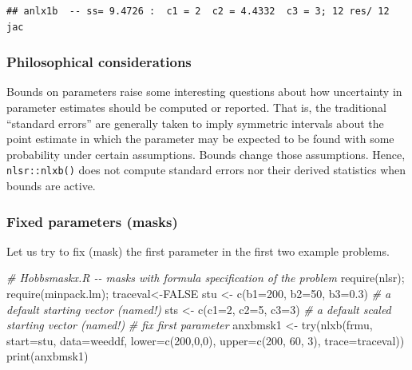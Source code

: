 \documentclass[
]{article}
\newenvironment{Shaded}{\begin{snugshade}}{\end{snugshade}}
\newcommand{\AttributeTok}[1]{\textcolor[rgb]{0.77,0.63,0.00}{#1}}
\newcommand{\CommentTok}[1]{\textcolor[rgb]{0.56,0.35,0.01}{\textit{#1}}}
\newcommand{\ConstantTok}[1]{\textcolor[rgb]{0.00,0.00,0.00}{#1}}
\newcommand{\DecValTok}[1]{\textcolor[rgb]{0.00,0.00,0.81}{#1}}
\newcommand{\FloatTok}[1]{\textcolor[rgb]{0.00,0.00,0.81}{#1}}
\newcommand{\FunctionTok}[1]{\textcolor[rgb]{0.00,0.00,0.00}{#1}}
\newcommand{\NormalTok}[1]{#1}
\newcommand{\OtherTok}[1]{\textcolor[rgb]{0.56,0.35,0.01}{#1}}
\begin{document}
\begin{verbatim}
## anlx1b  -- ss= 9.4726 :  c1 = 2  c2 = 4.4332  c3 = 3; 12 res/ 12 jac
\end{verbatim}

\hypertarget{philosophical-considerations}{%
\subsubsection{Philosophical
considerations}\label{philosophical-considerations}}

Bounds on parameters raise some interesting questions about how
uncertainty in parameter estimates should be computed or reported. That
is, the traditional ``standard errors'' are generally taken to imply
symmetric intervals about the point estimate in which the parameter may
be expected to be found with some probability under certain assumptions.
Bounds change those assumptions. Hence, \texttt{nlsr::nlxb()} does not
compute standard errors nor their derived statistics when bounds are
active.

\hypertarget{fixed-parameters-masks}{%
\subsubsection{Fixed parameters (masks)}\label{fixed-parameters-masks}}

Let us try to fix (mask) the first parameter in the first two example
problems.

\begin{Shaded}
\begin{Highlighting}[]
\CommentTok{\# Hobbsmaskx.R {-}{-} masks with formula specification of the problem}
\FunctionTok{require}\NormalTok{(nlsr); }\FunctionTok{require}\NormalTok{(minpack.lm); traceval}\OtherTok{\textless{}{-}}\ConstantTok{FALSE}
\NormalTok{stu }\OtherTok{\textless{}{-}} \FunctionTok{c}\NormalTok{(}\AttributeTok{b1=}\DecValTok{200}\NormalTok{, }\AttributeTok{b2=}\DecValTok{50}\NormalTok{, }\AttributeTok{b3=}\FloatTok{0.3}\NormalTok{) }\CommentTok{\# a default starting vector (named!)}
\NormalTok{sts }\OtherTok{\textless{}{-}} \FunctionTok{c}\NormalTok{(}\AttributeTok{c1=}\DecValTok{2}\NormalTok{, }\AttributeTok{c2=}\DecValTok{5}\NormalTok{, }\AttributeTok{c3=}\DecValTok{3}\NormalTok{) }\CommentTok{\# a default scaled starting vector (named!)}
\CommentTok{\# fix first parameter}
\NormalTok{anxbmsk1 }\OtherTok{\textless{}{-}} \FunctionTok{try}\NormalTok{(}\FunctionTok{nlxb}\NormalTok{(frmu, }\AttributeTok{start=}\NormalTok{stu, }\AttributeTok{data=}\NormalTok{weeddf, }\AttributeTok{lower=}\FunctionTok{c}\NormalTok{(}\DecValTok{200}\NormalTok{,}\DecValTok{0}\NormalTok{,}\DecValTok{0}\NormalTok{), }
            \AttributeTok{upper=}\FunctionTok{c}\NormalTok{(}\DecValTok{200}\NormalTok{, }\DecValTok{60}\NormalTok{, }\DecValTok{3}\NormalTok{), }\AttributeTok{trace=}\NormalTok{traceval))}
\FunctionTok{print}\NormalTok{(anxbmsk1)}
\end{Highlighting}
\end{Shaded}
\end{document}
